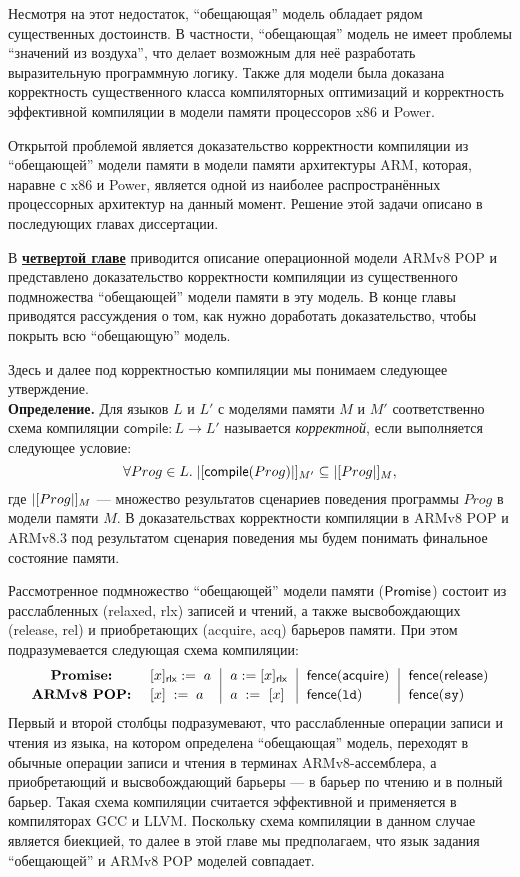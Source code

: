 Несмотря на этот недостаток, ``обещающая'' модель обладает рядом существенных достоинств.
В частности, ``обещающая'' модель не имеет проблемы ``значений из воздуха'', что делает возможным для неё разработать
выразительную программную логику. Также для модели была доказана корректность существенного класса компиляторных
оптимизаций и корректность эффективной компиляции в модели памяти процессоров x86 и Power.

Открытой проблемой является доказательство корректности компиляции из ``обещающей'' модели памяти в модели памяти архитектуры
ARM, которая, наравне с x86 и Power, является одной из наиболее распространённых процессорных архитектур на данный момент.
Решение этой задачи описано в последующих главах диссертации.

В \underline{\textbf{четвертой главе}} приводится описание операционной модели ARMv8 POP и представлено доказательство
корректности компиляции из существенного подмножества ``обещающей'' модели памяти в эту модель.
В конце главы приводятся рассуждения о том, как нужно доработать доказательство, чтобы покрыть всю ``обещающую'' модель.

Здесь и далее под корректностью компиляции мы понимаем следующее утверждение.\\
\textbf{Определение.} Для языков $L$ и $L'$ с моделями памяти $M$ и $M'$ соответственно схема компиляции $\textsf{compile} : L \rightarrow L'$
называется \emph{корректной}, если выполняется следующее условие:
\[ \forall Prog \in L. \; |[\textsf{compile}(Prog)|]_{M'} \subseteq |[Prog|]_{M}, \]
где $|[Prog|]_{M}$ --- множество результатов сценариев поведения программы $Prog$ в модели памяти $M$.
В доказательствах корректности компиляции в ARMv8 POP и ARMv8.3 под результатом сценария поведения мы будем
понимать финальное состояние памяти.

Рассмотренное подмножество ``обещающей'' модели памяти ($\mathsf{Promise}$) состоит из расслабленных (relaxed, rlx) записей и чтений,
а также высвобождающих (release, rel) и приобретающих (acquire, acq) барьеров памяти. При этом подразумевается следующая
схема компиляции:
\[
  \begin{array}{c@{~~}@{~~}l@{~~}|@{~~}l@{~~}|@{~~}l@{~~}|@{~~}l}
    \textbf{Promise:}   & [x]_{\textsf{rlx}} := \; a & a := [x]_{\textsf{rlx}}  &  \acqFence & \relFence \\[2pt]
    \textbf{ARMv8 POP:} & \writeInst{x}{a}    & \readInst{a}{x}  &  \dmbLD & \dmbSY \\
  \end{array}
\]
Первый и второй столбцы подразумевают, что расслабленные операции записи и чтения из языка, на котором определена ``обещающая'' модель,
переходят в обычные операции записи и чтения в терминах ARMv8-ассемблера, а приобретающий и высвобождающий барьеры --- в барьер
по чтению и в полный барьер. Такая схема компиляции считается эффективной и применяется в компиляторах GCC и LLVM.
Поскольку схема компиляции в данном случае является биекцией, то далее в этой главе мы предполагаем, что язык задания ``обещающей'' и ARMv8 POP
моделей совпадает.

